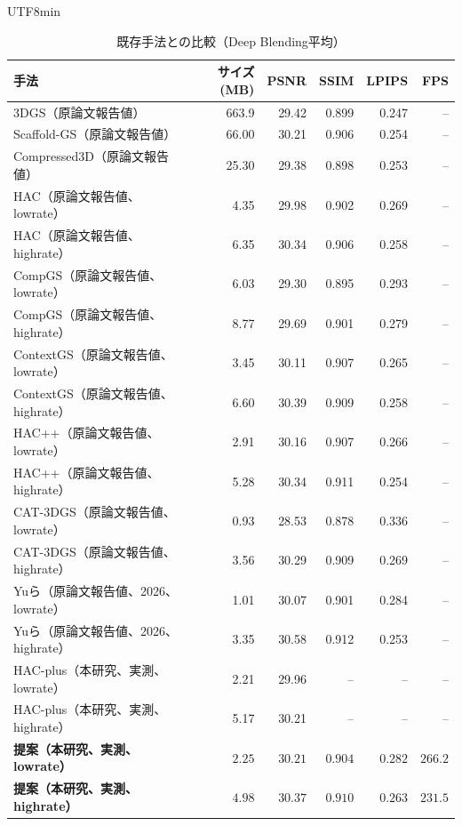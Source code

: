 \documentclass{ieeeaccess}
\begin{document}
\begin{CJK}{UTF8}{min}
\begin{table}[!t]
\renewcommand{\arraystretch}{1.2}
\caption{既存手法との比較（Deep Blending平均）}
\label{tab:literature-db}
\centering
\begin{tabular}{p{5.2cm}rrrrr}
\toprule
手法 & サイズ (MB) & PSNR & SSIM & LPIPS & FPS \\
\midrule
3DGS\cite{kerbl20233d}（原論文報告値） & 663.9 & 29.42 & 0.899 & 0.247 & -- \\
Scaffold-GS\cite{lu2024scaffold}（原論文報告値） & 66.00 & 30.21 & 0.906 & 0.254 & -- \\
Compressed3D\cite{niedermayr2024compressed}（原論文報告値） & 25.30 & 29.38 & 0.898 & 0.253 & -- \\
HAC\cite{chen2024hac}（原論文報告値、lowrate） & 4.35 & 29.98 & 0.902 & 0.269 & -- \\
HAC\cite{chen2024hac}（原論文報告値、highrate） & 6.35 & 30.34 & 0.906 & 0.258 & -- \\
CompGS\cite{liu2024compgs}（原論文報告値、lowrate） & 6.03 & 29.30 & 0.895 & 0.293 & -- \\
CompGS\cite{liu2024compgs}（原論文報告値、highrate） & 8.77 & 29.69 & 0.901 & 0.279 & -- \\
ContextGS\cite{wang2024contextgs}（原論文報告値、lowrate） & 3.45 & 30.11 & 0.907 & 0.265 & -- \\
ContextGS\cite{wang2024contextgs}（原論文報告値、highrate） & 6.60 & 30.39 & 0.909 & 0.258 & -- \\
HAC++\cite{chen2025hacpp}（原論文報告値、lowrate） & 2.91 & 30.16 & 0.907 & 0.266 & -- \\
HAC++\cite{chen2025hacpp}（原論文報告値、highrate） & 5.28 & 30.34 & 0.911 & 0.254 & -- \\
CAT-3DGS\cite{zhan2025cat3dgs}（原論文報告値、lowrate） & 0.93 & 28.53 & 0.878 & 0.336 & -- \\
CAT-3DGS\cite{zhan2025cat3dgs}（原論文報告値、highrate） & 3.56 & 30.29 & 0.909 & 0.269 & -- \\
Yuら\cite{yu2026practical}（原論文報告値、2026、lowrate） & 1.01 & 30.07 & 0.901 & 0.284 & -- \\
Yuら\cite{yu2026practical}（原論文報告値、2026、highrate） & 3.35 & 30.58 & 0.912 & 0.253 & -- \\
\midrule
HAC-plus（本研究、実測、lowrate） & 2.21 & 29.96 & -- & -- & -- \\
HAC-plus（本研究、実測、highrate） & 5.17 & 30.21 & -- & -- & -- \\
\textbf{提案（本研究、実測、lowrate）} & $\mathbf{2.25}$ & $\mathbf{30.21}$ & $\mathbf{0.904}$ & $\mathbf{0.282}$ & $\mathbf{266.2}$ \\
\textbf{提案（本研究、実測、highrate）} & $\mathbf{4.98}$ & $\mathbf{30.37}$ & $\mathbf{0.910}$ & $\mathbf{0.263}$ & $\mathbf{231.5}$ \\
\bottomrule
\end{tabular}
\end{table}


\end{CJK}
\end{document}
